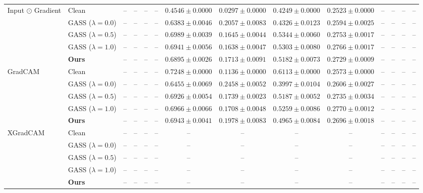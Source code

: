 \begin{table}[t]
{\begin{tabular}{ll|cccc|cccc|cccc}
\multirow{5}{*}{Input $\odot$ Gradient}
& Clean & -- & -- & -- & -- & $0.4546 \pm 0.0000$ & $\mathbf{0.0297 \pm 0.0000}$ & $0.4249 \pm 0.0000$ & $0.2523 \pm 0.0000$ & -- & -- & -- & -- \\
& GASS ($\lambda=0.0$) & -- & -- & -- & -- & $0.6383 \pm 0.0046$ & $0.2057 \pm 0.0083$ & $0.4326 \pm 0.0123$ & $0.2594 \pm 0.0025$ & -- & -- & -- & -- \\
& GASS ($\lambda=0.5$) & -- & -- & -- & -- & $\mathbf{0.6989 \pm 0.0039}$ & $0.1645 \pm 0.0044$ & $\mathbf{0.5344 \pm 0.0060}$ & $0.2753 \pm 0.0017$ & -- & -- & -- & -- \\
& GASS ($\lambda=1.0$) & -- & -- & -- & -- & $0.6941 \pm 0.0056$ & $0.1638 \pm 0.0047$ & $0.5303 \pm 0.0080$ & $\mathbf{0.2766 \pm 0.0017}$ & -- & -- & -- & -- \\
& \textbf{Ours} & -- & -- & -- & -- & $0.6895 \pm 0.0026$ & $0.1713 \pm 0.0091$ & $0.5182 \pm 0.0073$ & $0.2729 \pm 0.0009$ & -- & -- & -- & -- \\
\midrule

\multirow{5}{*}{GradCAM}
& Clean & -- & -- & -- & -- & $\mathbf{0.7248 \pm 0.0000}$ & $\mathbf{0.1136 \pm 0.0000}$ & $\mathbf{0.6113 \pm 0.0000}$ & $0.2573 \pm 0.0000$ & -- & -- & -- & -- \\
& GASS ($\lambda=0.0$) & -- & -- & -- & -- & $0.6455 \pm 0.0069$ & $0.2458 \pm 0.0052$ & $0.3997 \pm 0.0104$ & $0.2606 \pm 0.0027$ & -- & -- & -- & -- \\
& GASS ($\lambda=0.5$) & -- & -- & -- & -- & $0.6926 \pm 0.0054$ & $0.1739 \pm 0.0023$ & $0.5187 \pm 0.0052$ & $0.2735 \pm 0.0034$ & -- & -- & -- & -- \\
& GASS ($\lambda=1.0$) & -- & -- & -- & -- & $0.6966 \pm 0.0066$ & $0.1708 \pm 0.0048$ & $0.5259 \pm 0.0086$ & $\mathbf{0.2770 \pm 0.0012}$ & -- & -- & -- & -- \\
& \textbf{Ours} & -- & -- & -- & -- & $0.6943 \pm 0.0041$ & $0.1978 \pm 0.0083$ & $0.4965 \pm 0.0084$ & $0.2696 \pm 0.0018$ & -- & -- & -- & -- \\
\midrule

\multirow{5}{*}{XGradCAM}
& Clean & -- & -- & -- & -- & -- & -- & -- & -- & -- & -- & -- & -- \\
& GASS ($\lambda=0.0$) & -- & -- & -- & -- & -- & -- & -- & -- & -- & -- & -- & -- \\
& GASS ($\lambda=0.5$) & -- & -- & -- & -- & -- & -- & -- & -- & -- & -- & -- & -- \\
& GASS ($\lambda=1.0$) & -- & -- & -- & -- & -- & -- & -- & -- & -- & -- & -- & -- \\
& \textbf{Ours} & -- & -- & -- & -- & -- & -- & -- & -- & -- & -- & -- & -- \\


\end{tabular}}
\end{table}
